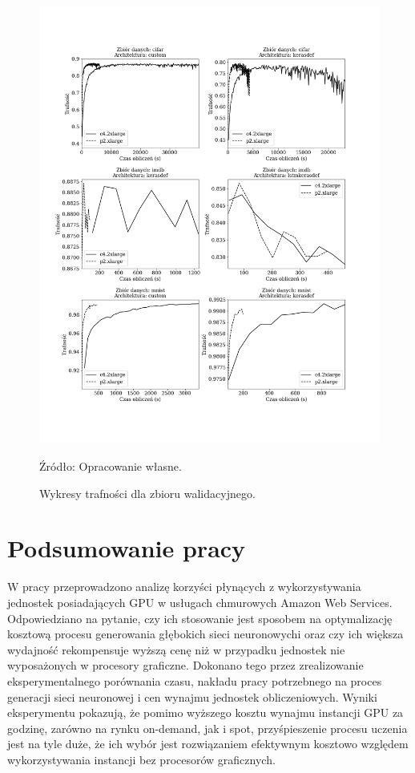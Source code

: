 \documentclass[12pt,a4paper,twoside]{article}
\newcommand{\source}[1]{\caption*{\hfill Źródło: {#1}} }
\begin{document}
\begin{figure}[h]
  \centering
\includegraphics[scale=0.5]{../obrazy/fig:experiment_acc_val.png}
\caption{Wykresy trafności dla zbioru walidacyjnego.\label{fig:experiment_acc_val}}
\source{Opracowanie własne.}
\end{figure}

\clearpage

\section{Podsumowanie pracy}

\noindent
W pracy przeprowadzono analizę korzyści płynących z wykorzystywania jednostek posiadających GPU w usługach chmurowych Amazon Web Services. Odpowiedziano na pytanie, czy ich stosowanie jest sposobem na optymalizację kosztową procesu generowania głębokich sieci neuronowychi oraz czy ich większa wydajność rekompensuje wyższą cenę niż w przypadku jednostek nie wyposażonych w procesory graficzne. Dokonano tego przez zrealizowanie eksperymentalnego porównania czasu, nakładu pracy potrzebnego na proces generacji sieci neuronowej i cen wynajmu jednostek obliczeniowych. Wyniki eksperymentu pokazują, że pomimo wyższego kosztu wynajmu instancji GPU za godzinę, zarówno na rynku on-demand, jak i spot, przyśpieszenie procesu uczenia jest na tyle duże, że ich wybór jest rozwiązaniem efektywnym kosztowo względem wykorzystywania instancji bez procesorów graficznych.
\end{document}
